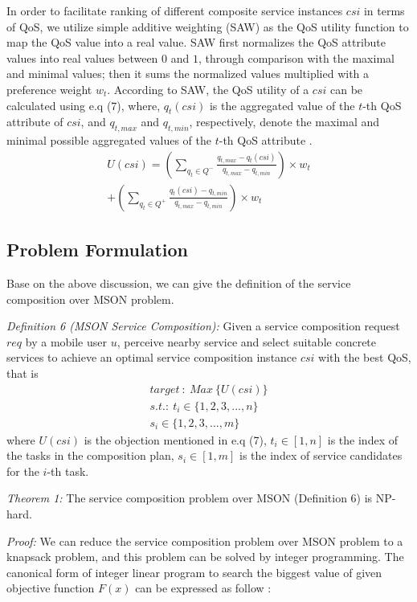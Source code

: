 \documentclass[10pt,journal,compsoc]{IEEEtran}
\begin{document}
In order to facilitate ranking of different composite service instances $csi$ in terms of QoS, we utilize simple additive weighting (SAW) as the QoS utility function to map the QoS value into a real value. SAW first normalizes the QoS attribute values into real values between $0$ and $1$, through comparison with the maximal and minimal values; then it sums the normalized values multiplied with a preference weight $w_t$. According to SAW, the QoS utility of a $csi$ can be calculated using e.q (7), where, $q_t(csi)$ is the aggregated value of the $t$-th QoS attribute of $csi$, and $q_{t,max}$ and $q_{t,min}$, respectively, denote the maximal and minimal possible aggregated values of the $t$-th QoS attribute \cite{Wu2016}.
\begin{eqnarray}
U(csi) = (\sum_{q_t \in Q^-} \frac{q_{t,max}-q_t(csi)}{q_{t,max}-q_{t,min}})\times w_t \\\nonumber
+(\sum_{q_t \in Q^+} \frac{q_t(csi)-q_{t,min}}{q_{t,max}-q_{t,min}})\times w_t
\end{eqnarray}

\subsection{Problem Formulation}
Base on the above discussion, we can give the definition of the service composition over MSON problem.

\textit{Definition 6 (MSON Service Composition):} Given a service composition request $req$ by a mobile user $u$, perceive nearby service and select suitable concrete services to achieve an optimal service composition instance $csi$ with the best QoS, that is
\begin{eqnarray}
target \ : \  Max \ \{U(csi)\}   \\\nonumber
s.t. : \ t_i \in \{1,2,3,...,n\}  \\\nonumber
s_i \in \{1,2,3,...,m \}
\end{eqnarray}
where $U(csi)$ is the objection mentioned in e.q (7), $t_i \in [1,n]$ is the index of the tasks in the composition plan, $s_i \in [1, m]$ is the index of service candidates for the $i$-th task.

\textit{Theorem 1:} The service composition problem over MSON (Definition 6) is NP-hard.

\textit{Proof:} We can reduce the service composition problem over MSON problem to a knapsack problem, and this problem can be solved by integer programming. 
The canonical form of integer linear program to search the biggest value of given objective function $F(x)$ can be expressed as follow \cite{papadimitriou1998combinatorial}:
\end{document}
